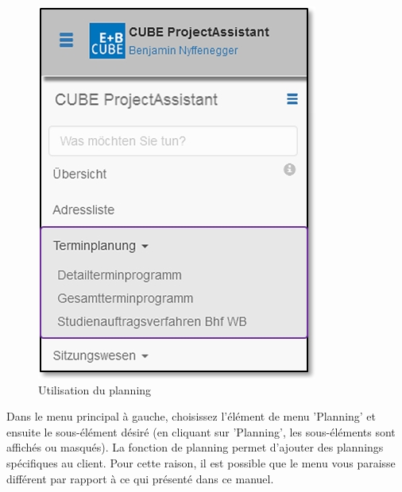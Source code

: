 \begin{figure}   %
  \vspace{-35pt}      %
  \begin{center}
    \includegraphics[width=1\linewidth]{../chapters/04_Terminplanung/pictures/4-1_Menu_Terminplanung.jpg}
  \end{center}
  \vspace{-20pt}
  \caption{Utilisation du planning}
  \vspace{-10pt}
\end{figure}

Dans le menu principal à gauche, choisissez l'élément de menu 'Planning' et ensuite le sous-élément désiré (en cliquant sur 'Planning', les sous-éléments sont affichés ou masqués). La fonction de planning permet d'ajouter des plannings spécifiques au client. Pour cette raison, il est possible que le menu vous paraisse différent par rapport à ce qui présenté dans ce manuel. \\

